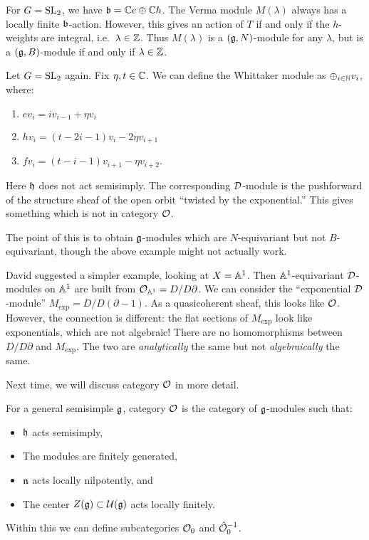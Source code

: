 \documentclass{article}
\begin{document}
\begin{ex}
	For $G = \SL_2$, we have $\bfr = \CC e \oplus \CC h$.
	The Verma module $M(\lambda)$ always has a locally finite $\bfr$-action.
	However, this gives an action of $T$ if and only if the $h$-weights are integral, i.e.\ $\lambda \in \ZZ$.
	Thus $M(\lambda)$ is a $(\gfr, N)$-module for any $\lambda$, but is a $(\gfr, B)$-module if and only if $\lambda \in \ZZ$.
\end{ex}

\begin{ex}
	Let $G = \SL_2$ again.
	Fix $\eta, t \in \CC$.
	We can define the Whittaker module as $\oplus_{i \in \NN} v_i$, where:
	\begin{enumerate}
		\item $e v_i = i v_{i-1} + \eta v_i$
		\item $h v_i = (t - 2i - 1) v_i - 2 \eta v_{i+1}$
		\item $f v_i = (t - i - 1) v_{i+1} - \eta v_{i+2}$.
	\end{enumerate}
	Here $\hfr$ does not act semisimply.
	The corresponding $\Dc$-module is the pushforward of the structure sheaf of the open orbit ``twisted by the exponential.''
	This gives something which is not in category $\Oc$.
\end{ex}

The point of this is to obtain $\gfr$-modules which are $N$-equivariant but not $B$-equivariant, though the above example might not actually work.

\begin{rmk}
	David suggested a simpler example, looking at $X = \AA^1$.
	Then $\AA^1$-equivariant $\Dc$-modules on $\AA^1$ are built from $\Oc_{\AA^1} = D / D \partial$.
	We can consider the ``exponential $\Dc$-module'' $M_{\exp} = D / D (\partial - 1)$.
	As a quasicoherent sheaf, this looks like $\Oc$.
	However, the connection is different: the flat sections of $M_{\exp}$ look like exponentials, which are not algebraic!
	There are no homomorphisms between $D / D \partial$ and $M_{\exp}$.
	The two are \emph{analytically} the same but not \emph{algebraically} the same.
\end{rmk}

Next time, we will discuss category $\Oc$ in more detail.

\begin{dfn}
	For a general semisimple $\gfr$, category $\Oc$ is the category of $\gfr$-modules such that:
	\begin{itemize}
		\item $\hfr$ acts semisimply,
		\item The modules are finitely generated,
		\item $\nfr$ acts locally nilpotently, and
		\item The center $Z(\gfr) \subset \Uc(\gfr)$ acts locally finitely.
	\end{itemize}
	Within this we can define subcategories $\Oc_0$ and $\hat{\Oc}_0\inv$.
\end{dfn}
\end{document}
